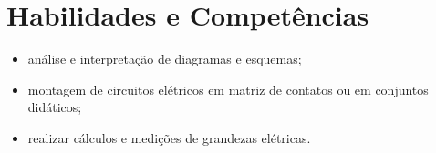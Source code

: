 \section{Habilidades e Competências}
\begin{itemize}
    \item análise e interpretação de diagramas e esquemas;
    \item montagem de circuitos elétricos em matriz de contatos ou em conjuntos didáticos;
    \item realizar cálculos e medições de grandezas elétricas.
\end{itemize}
